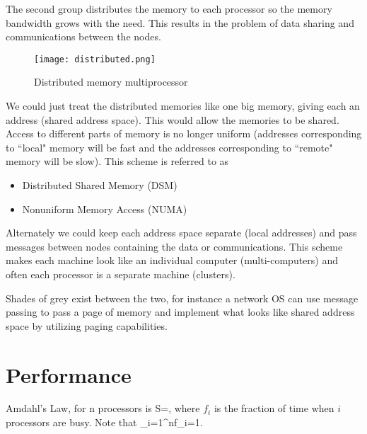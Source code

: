 The second group distributes the memory to each processor so the memory bandwidth grows with the need.  This results in the problem of data sharing and communications between the nodes.
\begin{figure}[h]
  \begin{center}
  \texttt{[image: distributed.png]}\\
  \caption{Distributed memory multiprocessor}\label{f-distributed}
  \end{center}
\end{figure}
We could just treat the distributed memories like one big memory, giving each an address (shared address space).  This would allow the memories to be shared.  Access to different parts of memory is no longer uniform (addresses corresponding to ``local" memory will be fast and the addresses corresponding to ``remote" memory will be slow).  This scheme is referred to as
\begin{itemize}
    \item Distributed Shared Memory (DSM)
    \item Nonuniform Memory Access (NUMA)
\end{itemize}

Alternately we could keep each address space separate (local addresses) and pass messages between nodes containing the data or communications.  This scheme makes each machine look like an individual computer (multi-computers) and often each processor is a separate machine (clusters).

Shades of grey exist between the two, for instance a network OS can use message passing to pass a page of memory and implement what looks like shared address space by utilizing paging capabilities.


\section{Performance}

Amdahl's Law, for n processors is
\beq
S=,
\eeq
where $f_i$ is the fraction of time when $i$ processors are busy.  Note that
\beq
\sum_{i=1}^nf_i=1.
\eeq

